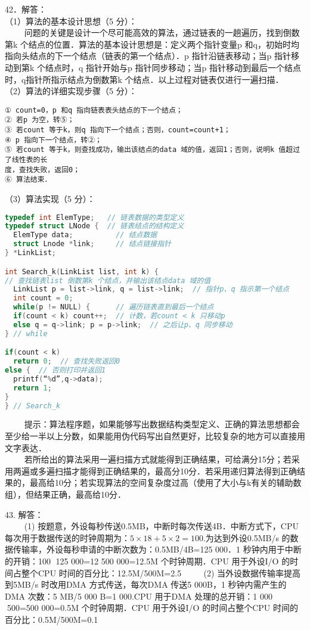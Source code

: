 42．解答： \\
（1）算法的基本设计思想（5 分）： \\
$\qquad$ 问题的关键是设计一个尽可能高效的算法，通过链表的一趟遍历，找到倒数第k 个结点的位置．算法的基本设计思想是：定义两个指针变量p 和q，初始时均指向头结点的下一个结点（链表的第一个结点）．p 指针沿链表移动；当p 指针移动到第k 个结点时，q 指针开始与p 指针同步移动；当p 指针移动到最后一个结点时，q指针所指示结点为倒数第k 个结点．以上过程对链表仅进行一遍扫描． \\
（2）算法的详细实现步骤（5 分）： 
\begin{lstlisting}
① count=0，p 和q 指向链表表头结点的下一个结点；
② 若p 为空，转⑤；
③ 若count 等于k，则q 指向下一个结点；否则，count=count+1；
④ p 指向下一个结点，转②；
⑤ 若count 等于k，则查找成功，输出该结点的data 域的值，返回1；否则，说明k 值超过了线性表的长
度，查找失败，返回0；
⑥ 算法结束．
\end{lstlisting}
（3）算法实现（5 分）： \\
\begin{lstlisting}[language=cpp]
typedef int ElemType;   // 链表数据的类型定义
typedef struct LNode {  // 链表结点的结构定义
  ElemType data;          // 结点数据
  struct Lnode *link;     // 结点链接指针
} *LinkList;

int Search_k(LinkList list, int k) {
// 查找链表list 倒数第k 个结点，并输出该结点data 域的值
  LinkList p = list->link, q = list->link;  // 指针p、q 指示第一个结点
  int count = 0;
  while(p != NULL) {      // 遍历链表直到最后一个结点
  if(count < k) count++;  // 计数，若count < k 只移动p
  else q = q->link; p = p->link;  // 之后让p、q 同步移动
} // while

if(count < k)
  return 0;  // 查找失败返回0
else {  // 否则打印并返回1
  printf(“%d”,q->data);
  return 1;
}
} // Search_k
\end{lstlisting}
$\qquad$ 提示：算法程序题，如果能够写出数据结构类型定义、正确的算法思想都会至少给一半以上分数，如果能用伪代码写出自然更好，比较复杂的地方可以直接用文字表达． \\
$\qquad$ 若所给出的算法采用一遍扫描方式就能得到正确结果，可给满分15分；若采用两遍或多遍扫描才能得到正确结果的，最高分10分．若采用递归算法得到正确结果的，最高给10分；若实现算法的空间复杂度过高（使用了大小与k有关的辅助数组），但结果正确，最高给10分．

43. 解答： \\
$\qquad$ (1) 按题意，外设每秒传送0.5MB，中断时每次传送4B．中断方式下，CPU 每次用于数据传送的时钟周期为：$5\times18+5\times2=100$.为达到外设0.5MB/s 的数据传输率，外设每秒申请的中断次数为：0.5MB/4B=125 000．1 秒钟内用于中断的开销：100 125 000=12 500 000=12.5M 个时钟周期．CPU 用于外设I/O 的时间占整个CPU 时间的百分比：12.5M/500M=2.5%
$\qquad$ (2) 当外设数据传输率提高到5MB/s 时改用DMA 方式传送，每次DMA 传送5 000B，1 秒钟内需产生的DMA 次数：5 MB/5 000 B=1 000.CPU 用于DMA 处理的总开销：1 000 500=500 000=0.5M 个时钟周期．CPU 用于外设I/O 的时间占整个CPU 时间的百分比：0.5M/500M=0.1%